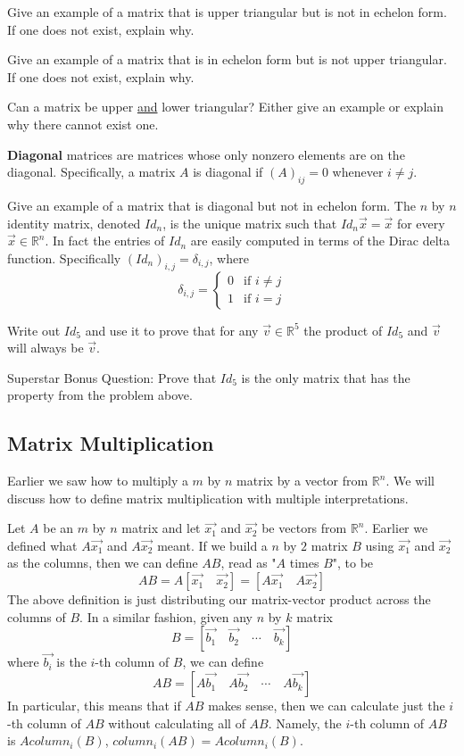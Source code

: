 \bq Give an example of a matrix that is upper triangular but is not in echelon form. If one does not exist, explain why.
\eq

\bq Give an example of a matrix that is in echelon form but is not upper triangular. If one does not exist, explain why.
\eq

\bq Can a matrix be upper \underline{and} lower triangular? Either give an example or explain why there cannot exist one.
\eq

\textbf{Diagonal} matrices are matrices whose only nonzero elements are on the diagonal. Specifically, a matrix $A$ is diagonal if $(A)_{ij}=0$ whenever $i \neq j$.

\bq Give an example of a matrix that is diagonal but not in echelon form.
\eq
The $n$ by $n$ identity matrix, denoted $Id_n$, is the unique matrix such that $Id_n \vec{x}= \vec{x}$ for every $\vec{x} \in \mathbb{R}^n$. In fact the entries of $Id_n$ are easily computed in terms of the Dirac delta function. Specifically $(Id_n)_{i,j}=\delta_{i,j}$, where $$\delta_{i,j}=\left\{ \begin{array}{cc} 0 & \mbox{if }i\neq j\\ 1 & \mbox{if } i = j \end{array} \right. $$

\bq Write out $Id_5$ and use it to prove that for any $\vec{v} \in \mathbb{R}^5$ the product of $Id_5$ and $\vec{v}$ will always be $\vec{v}$.
\eq

\bq Superstar Bonus Question: Prove that $Id_5$ is the only matrix that has the property from the problem above.
\eq

\subsection{Matrix Multiplication}
Earlier we saw how to multiply a $m$ by $n$ matrix by a vector from $\mathbb{R}^n$. We will discuss how to define matrix multiplication with multiple interpretations.

Let $A$ be an $m$ by $n$ matrix and let $\vec{x_1}$ and $\vec{x_2}$ be vectors from $\mathbb{R}^n$. Earlier we defined what $A\vec{x_1}$ and $A\vec{x_2}$ meant. If we build a $n$ by $2$ matrix $B$ using $\vec{x_1}$ and $\vec{x_2}$ as the columns, then we can define $AB$, read as "$A$ times $B$", to be $$AB=A [\vec{x_1} \quad \vec{x_2}]=[A\vec{x_1} \quad A\vec{x_2}]$$
The above definition is just distributing our matrix-vector product across the columns of $B$. In a similar fashion, given any $n$ by $k$ matrix $$B=[\vec{b_1} \quad  \vec{b_2}  \quad \cdots \quad  \vec{b_k}]$$
where $\vec{b_i}$ is the $i$-th column of $B$, we can define
$$AB=[A\vec{b_1}  \quad A\vec{b_2}  \quad \cdots  \quad A\vec{b_k}]$$
In particular, this means that if $AB$ makes sense, then we can calculate just the $i$-th column of $AB$ without calculating all of $AB$. Namely, the $i$-th column of $AB$ is $A column_i(B)$, $column_i(AB)=A column_i(B)$.

